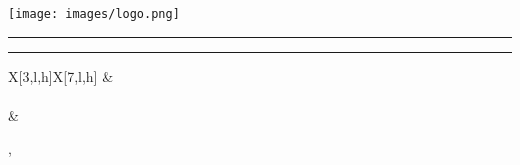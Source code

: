 \begin{titlepage}
    \centering

    \begingroup
        \selectfont
        \Large\MakeUppercase\university
    \endgroup

    \begingroup
        \selectfont
        \MakeUppercase\faculty
    \endgroup

    \vspace{64pt}

    \texttt{[image: images/logo.png]}

    \vspace{64pt}

    \begingroup
        \selectfont
        \MakeUppercase\pdfsubject
    \endgroup

    \parbox[c][\baselineskip]{\textwidth}{\vfill\rule{\textwidth}{0.5pt}\vfill}

    \begingroup
        \selectfont
        \Large\MakeUppercase\pdfproject
    \endgroup

    \parbox[c][\baselineskip]{\textwidth}{\vfill\rule{\textwidth}{0.5pt}\vfill}

    \begin{minipage}{0.8\linewidth}
        \begin{tblr}{X[3,l,h]X[7,l,h]}
            {\instructorsname}  & {\instructors}
            \\\\
            {\implementersname} & {\implementers}
        \end{tblr}
    \end{minipage}

    \vfill

    \begingroup
        \location, \datetime
    \endgroup

\end{titlepage}

\clearpage
